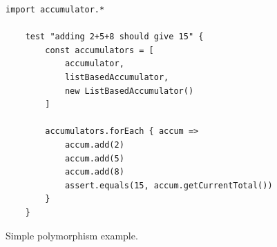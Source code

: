 \begin{figure}[ht]
\vspace{-3mm}
 \centering
 \begin{lstlisting}[language=Wollok]
 	import accumulator.*

	test "adding 2+5+8 should give 15" {
		const accumulators = [ 
			accumulator, 
			listBasedAccumulator,
			new ListBasedAccumulator()
		]

		accumulators.forEach { accum =>
			accum.add(2)
			accum.add(5)
			accum.add(8)
			assert.equals(15, accum.getCurrentTotal())	
		}
	}\end{lstlisting}
\vspace{-3mm}
\caption{\small Simple polymorphism example.}
\label{fig:polymorphism}
\end{figure}

